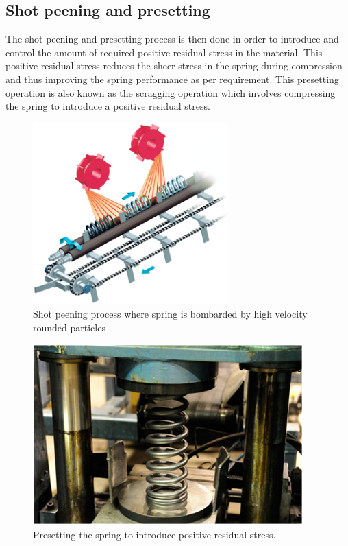 \documentclass[11pt]{article}
\begin{document}
\subsection{Shot peening and presetting}
The shot peening and presetting process is then done in order to introduce and control the amount of required positive residual stress in the material. This positive residual stress reduces the sheer stress in the spring during compression and thus improving the spring performance as per requirement. This presetting operation is also known as the scragging operation which involves compressing the spring to introduce a positive residual stress.
\begin{figure}[H]
    \centering
    \includegraphics[height = 7cm]{./img/shotpeening1.png}
    \caption{Shot peening process where spring is bombarded by high velocity rounded particles \cite{b7}.}
    \label{fig:shotpeening1}
\end{figure}
\begin{figure}[H]
    \centering
    \includegraphics[height = 7cm]{./img/preset1.png}
    \caption{Presetting the spring to introduce positive residual stress.}
    \label{fig:preset1}
\end{figure}
\end{document}
